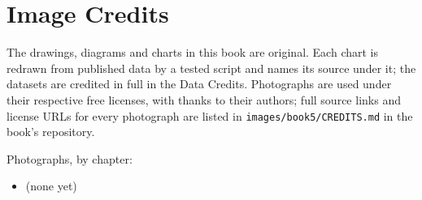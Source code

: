 \chapter*{Image Credits}

The drawings, diagrams and charts in this book are original. Each chart is
redrawn from published data by a tested script and names its source under it;
the datasets are credited in full in the Data Credits.
Photographs are used under their respective free licenses, with thanks to
their authors; full source links and license URLs for every photograph are
listed in \texttt{images/book5/CREDITS.md} in the book's repository.

\bigskip
\noindent Photographs, by chapter:
\begin{itemize}\small
  \item (none yet)
\end{itemize}
